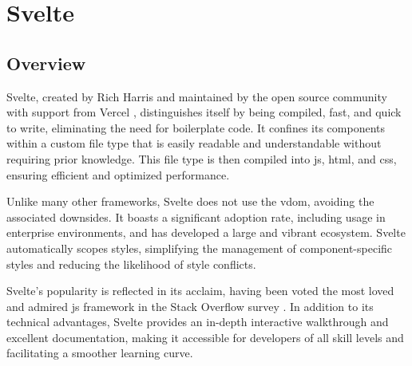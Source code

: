 
\section{Svelte}
\label{sec:svelte}

\subsection{Overview}
\label{subsec:svelte:overview}

Svelte, created by Rich Harris and maintained by the open source community with support from Vercel \cite{vercel:welcomes_rich}, distinguishes itself by being compiled, fast, and quick to write, eliminating the need for boilerplate code. It confines its components within a custom file type that is easily readable and understandable without requiring prior knowledge. This file type is then compiled into \acrshort{js}, \acrshort{html}, and \acrshort{css}, ensuring efficient and optimized performance.

Unlike many other frameworks, Svelte does not use the \acrshort{vdom}, avoiding the associated downsides. It boasts a significant adoption rate, including usage in enterprise environments, and has developed a large and vibrant ecosystem. Svelte automatically scopes styles, simplifying the management of component-specific styles and reducing the likelihood of style conflicts.

Svelte's popularity is reflected in its acclaim, having been voted the most loved and admired \acrshort{js} framework in the Stack Overflow survey \cite{stackoverflow:survey_2023}. In addition to its technical advantages, Svelte provides an in-depth interactive walkthrough and excellent documentation, making it accessible for developers of all skill levels and facilitating a smoother learning curve.


